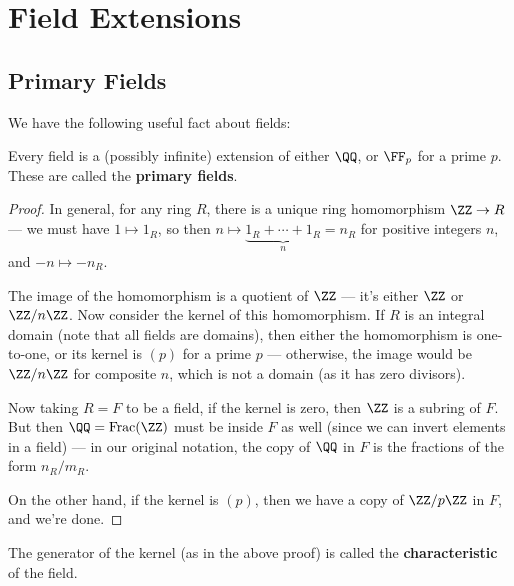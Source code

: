 
\section{Field Extensions}

\subsection{Primary Fields}

We have the following useful fact about fields:

\begin{fact}
    Every field is a (possibly infinite) extension of either $\QQ$, or $\FF_p$ for a prime $p$. These are called the \textbf{primary fields}. 
\end{fact}

\begin{proof}
    In general, for any ring $R$, there is a unique ring homomorphism $\ZZ \to R$ --- we must have $1 \mapsto 1_R$, so then $n \mapsto \underbrace{1_R + \cdots + 1_R}_n = n_R$ for positive integers $n$, and $-n \mapsto -n_R$. 

    The image of the homomorphism is a quotient of $\ZZ$ --- it's either $\ZZ$ or $\ZZ/n\ZZ$. Now consider the kernel of this homomorphism. If $R$ is an integral domain (note that all fields are domains), then either the homomorphism is one-to-one, or its kernel is $(p)$ for a prime $p$ --- otherwise, the image would be $\ZZ/n\ZZ$ for composite $n$, which is not a domain (as it has zero divisors). 
    
    Now taking $R = F$ to be a field, if the kernel is zero, then $\ZZ$ is a subring of $F$. But then $\QQ = \operatorname{Frac}(\ZZ)$ must be inside $F$ as well (since we can invert elements in a field) --- in our original notation, the copy of $\QQ$ in $F$ is the fractions of the form $n_R/m_R$.
    
    On the other hand, if the kernel is $(p)$, then we have a copy of $\ZZ/p\ZZ$ in $F$, and we're done. 
\end{proof}

\begin{definition}
The generator of the kernel (as in the above proof) is called the \textbf{characteristic} of the field. 
\end{definition}

